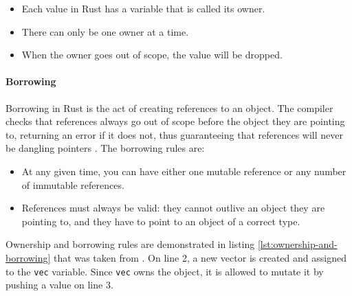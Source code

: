 \begin{itemize}
    \item Each value in Rust has a variable that is called its owner.
    \item There can only be one owner at a time.
    \item When the owner goes out of scope, the value will be dropped.
\end{itemize}

\paragraph{Borrowing}
Borrowing in Rust is the act of creating references to an object. The compiler checks that references always go out of scope before the object they are pointing to, returning an error if it does not, thus guaranteeing that references will never be dangling pointers \cite{reed-patina}. The borrowing rules are:

\begin{itemize}
    \item At any given time, you can have either one mutable reference or any number of immutable references.
    \item References must always be valid: they cannot outlive an object they are pointing to, and they have to point to an object of a correct type.
\end{itemize}

Ownership and borrowing rules are demonstrated in listing \ref{lst:ownership-and-borrowing} that was taken from \cite{linus-parallelization}. On line 2, a new vector is created and assigned to the \texttt{vec} variable. Since \texttt{vec} owns the object, it is allowed to mutate it by pushing a value on line 3.

